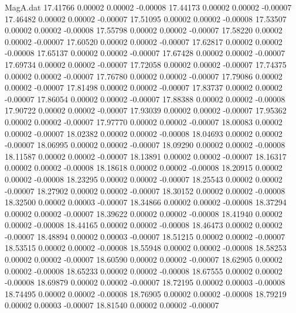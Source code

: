 \begin{filecontents}{MagA.dat}
  17.41766    0.00002    0.00002   -0.00008
  17.44173    0.00002    0.00002   -0.00007
  17.46482    0.00002    0.00002   -0.00007
  17.51095    0.00002    0.00002   -0.00008
  17.53507    0.00002    0.00002   -0.00008
  17.55798    0.00002    0.00002   -0.00007
  17.58220    0.00002    0.00002   -0.00007
  17.60520    0.00002    0.00002   -0.00007
  17.62817    0.00002    0.00002   -0.00008
  17.65137    0.00002    0.00002   -0.00007
  17.67428    0.00002    0.00002   -0.00007
  17.69734    0.00002    0.00002   -0.00007
  17.72058    0.00002    0.00002   -0.00007
  17.74375    0.00002    0.00002   -0.00007
  17.76780    0.00002    0.00002   -0.00007
  17.79086    0.00002    0.00002   -0.00007
  17.81498    0.00002    0.00002   -0.00007
  17.83737    0.00002    0.00002   -0.00007
  17.86054    0.00002    0.00002   -0.00007
  17.88388    0.00002    0.00002   -0.00008
  17.90722    0.00002    0.00002   -0.00007
  17.93039    0.00002    0.00002   -0.00007
  17.95362    0.00002    0.00002   -0.00007
  17.97770    0.00002    0.00002   -0.00007
  18.00083    0.00002    0.00002   -0.00007
  18.02382    0.00002    0.00002   -0.00008
  18.04693    0.00002    0.00002   -0.00007
  18.06995    0.00002    0.00002   -0.00007
  18.09290    0.00002    0.00002   -0.00008
  18.11587    0.00002    0.00002   -0.00007
  18.13891    0.00002    0.00002   -0.00007
  18.16317    0.00002    0.00002   -0.00008
  18.18618    0.00002    0.00002   -0.00008
  18.20915    0.00002    0.00002   -0.00008
  18.23295    0.00002    0.00002   -0.00007
  18.25543    0.00002    0.00002   -0.00007
  18.27902    0.00002    0.00002   -0.00007
  18.30152    0.00002    0.00002   -0.00008
  18.32500    0.00002    0.00003   -0.00007
  18.34866    0.00002    0.00002   -0.00008
  18.37294    0.00002    0.00002   -0.00007
  18.39622    0.00002    0.00002   -0.00008
  18.41940    0.00002    0.00002   -0.00008
  18.44165    0.00002    0.00002   -0.00008
  18.46473    0.00002    0.00002   -0.00007
  18.48894    0.00002    0.00003   -0.00007
  18.51215    0.00002    0.00002   -0.00007
  18.53515    0.00002    0.00002   -0.00008
  18.55948    0.00002    0.00002   -0.00008
  18.58253    0.00002    0.00002   -0.00007
  18.60590    0.00002    0.00002   -0.00007
  18.62905    0.00002    0.00002   -0.00008
  18.65233    0.00002    0.00002   -0.00008
  18.67555    0.00002    0.00002   -0.00008
  18.69879    0.00002    0.00002   -0.00007
  18.72195    0.00002    0.00003   -0.00008
  18.74495    0.00002    0.00002   -0.00008
  18.76905    0.00002    0.00002   -0.00008
  18.79219    0.00002    0.00003   -0.00007
  18.81540    0.00002    0.00002   -0.00007

\end{filecontents}
